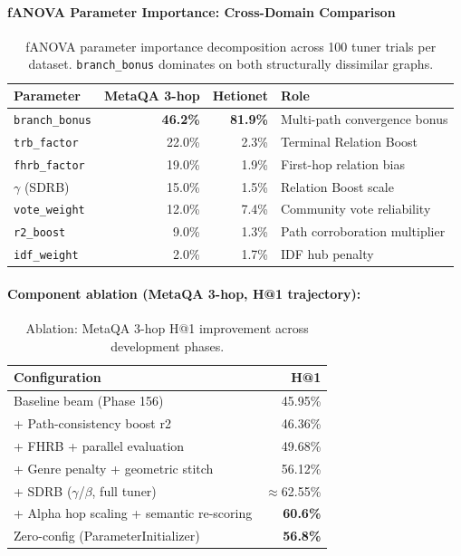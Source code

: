 \documentclass[11pt,a4paper]{article}
\begin{document}
\paragraph{fANOVA Parameter Importance: Cross-Domain Comparison}

\begin{table}[h]
\centering
\begin{tabular}{lrrp{5cm}}
\toprule
\textbf{Parameter} & \textbf{MetaQA 3-hop} & \textbf{Hetionet} & \textbf{Role} \\
\midrule
\texttt{branch\_bonus}          & \textbf{46.2\%} & \textbf{81.9\%} & Multi-path convergence bonus \\
\texttt{trb\_factor}            & 22.0\% & 2.3\%  & Terminal Relation Boost \\
\texttt{fhrb\_factor}           & 19.0\% & 1.9\%  & First-hop relation bias \\
$\gamma$ (SDRB)                 & 15.0\% & 1.5\%  & Relation Boost scale \\
\texttt{vote\_weight}           & 12.0\% & 7.4\%  & Community vote reliability \\
\texttt{r2\_boost}              &  9.0\% & 1.3\%  & Path corroboration multiplier \\
\texttt{idf\_weight}            &  2.0\% & 1.7\%  & IDF hub penalty \\
\bottomrule
\end{tabular}
\caption{fANOVA parameter importance decomposition across 100 tuner trials per
dataset. \texttt{branch\_bonus} dominates on both structurally dissimilar graphs.}
\label{tab:fanova}
\end{table}

\paragraph{Component ablation (MetaQA 3-hop, H@1 trajectory):}

\begin{table}[h]
\centering
\begin{tabular}{lr}
\toprule
\textbf{Configuration} & \textbf{H@1} \\
\midrule
Baseline beam (Phase 156)                  & 45.95\% \\
+ Path-consistency boost r2                & 46.36\% \\
+ FHRB + parallel evaluation               & 49.68\% \\
+ Genre penalty + geometric stitch         & 56.12\% \\
+ SDRB ($\gamma$/$\beta$, full tuner)      & $\approx$62.55\% \\
+ Alpha hop scaling + semantic re-scoring  & \textbf{60.6\%} \\
Zero-config (ParameterInitializer)         & \textbf{56.8\%} \\
\bottomrule
\end{tabular}
\caption{Ablation: MetaQA 3-hop H@1 improvement across development phases.}
\label{tab:ablation}
\end{table}
\end{document}
